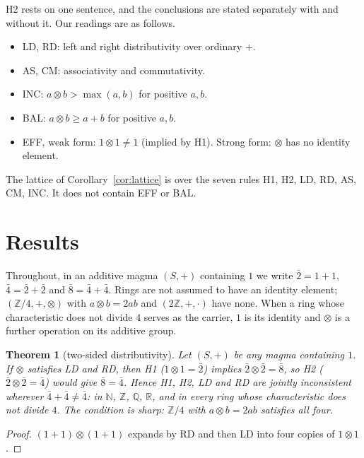 \documentclass[11pt]{article}
\newtheorem{theorem}{Theorem}
\theoremstyle{remark}
\begin{document}
H2 rests on one sentence, and the conclusions are stated separately with and without it. Our readings are as follows.
\begin{itemize}
\item LD, RD: left and right distributivity over ordinary $+$.
\item AS, CM: associativity and commutativity.
\item INC: $a\otimes b>\max(a,b)$ for positive $a,b$.
\item BAL: $a\otimes b\ge a+b$ for positive $a,b$.
\item EFF, weak form: $1\otimes 1\neq 1$ (implied by H1). Strong form: $\otimes$ has no identity element.
\end{itemize}
The lattice of Corollary~\ref{cor:lattice} is over the seven rules H1, H2, LD, RD, AS, CM, INC. It does not contain EFF or BAL.

\section{Results}
Throughout, in an additive magma $(S,+)$ containing $1$ we write $\bar2=1+1$, $\bar4=\bar2+\bar2$ and $\bar8=\bar4+\bar4$. Rings are not assumed to have an identity element; $(\mathbb Z/4,+,\otimes)$ with $a\otimes b=2ab$ and $(2\mathbb Z,+,\cdot)$ have none. When a ring whose characteristic does not divide $4$ serves as the carrier, $1$ is its identity and $\otimes$ is a further operation on its additive group.

\begin{theorem}[two-sided distributivity]\label{thm:two}
Let $(S,+)$ be any magma containing $1$. If $\otimes$ satisfies LD and RD, then H1 ($1\otimes1=\bar2$) implies $\bar2\otimes\bar2=\bar8$, so H2 ($\bar2\otimes\bar2=\bar4$) would give $\bar8=\bar4$. Hence H1, H2, LD and RD are jointly inconsistent wherever $\bar4+\bar4\neq\bar4$: in $\mathbb N$, $\mathbb Z$, $\mathbb Q$, $\mathbb R$, and in every ring whose characteristic does not divide $4$. The condition is sharp: $\mathbb Z/4$ with $a\otimes b=2ab$ satisfies all four.
\end{theorem}
\begin{proof}
$(1+1)\otimes(1+1)$ expands by RD and then LD into four copies of $1\otimes1$.
\end{proof}
\end{document}
